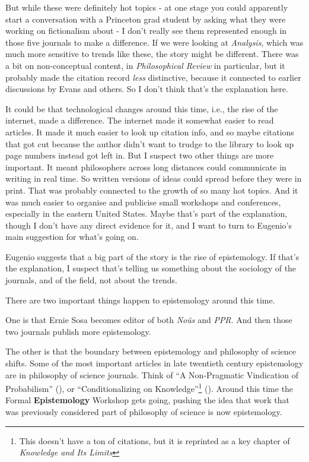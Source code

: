 \documentclass[
  11pt,
  letterpaper,
  DIV=11,
  numbers=noendperiod,
  twoside]{scrartcl}
\begin{document}
But while these were definitely hot topics - at one stage you could
apparently start a conversation with a Princeton grad student by asking
what they were working on fictionalism about - I don't really see them
represented enough in those five journals to make a difference. If we
were looking at \emph{Analysis}, which was much more sensitive to trends
like these, the story might be different. There was a bit on
non-conceptual content, in \emph{Philosophical Review} in particular,
but it probably made the citation record \emph{less} distinctive,
because it connected to earlier discussions by Evans and others. So I
don't think that's the explanation here.

It could be that technological changes around this time, i.e., the rise
of the internet, made a difference. The internet made it somewhat easier
to read articles. It made it much easier to look up citation info, and
so maybe citations that got cut because the author didn't want to trudge
to the library to look up page numbers instead got left in. But I
suspect two other things are more important. It meant philosophers
across long distances could communicate in writing in real time. So
written versions of ideas could spread before they were in print. That
was probably connected to the growth of so many hot topics. And it was
much easier to organise and publicise small workshops and conferences,
especially in the eastern United States. Maybe that's part of the
explanation, though I don't have any direct evidence for it, and I want
to turn to Eugenio's main suggestion for what's going on.

Eugenio suggests that a big part of the story is the rise of
epistemology. If that's the explanation, I suspect that's telling us
something about the sociology of the journals, and of the field, not
about the trends.

There are two important things happen to epistemology around this time.

One is that Ernie Sosa becomes editor of both \emph{Noûs} and
\emph{PPR}. And then those two journals publish more epistemology.

The other is that the boundary between epistemology and philosophy of
science shifts. Some of the most important articles in late twentieth
century epistemology are in philosophy of science journals. Think of ``A
Non-Pragmatic Vindication of Probabilism''
(), or ``Conditionalizing on
Knowledge''\footnote{This doesn't have a ton of citations, but it is
  reprinted as a key chapter of \emph{Knowledge and Its Limits}}
(). Around this time the
Formal \textbf{Epistemology} Workshop gets going, pushing the idea that
work that was previously considered part of philosophy of science is now
epistemology.
\end{document}
